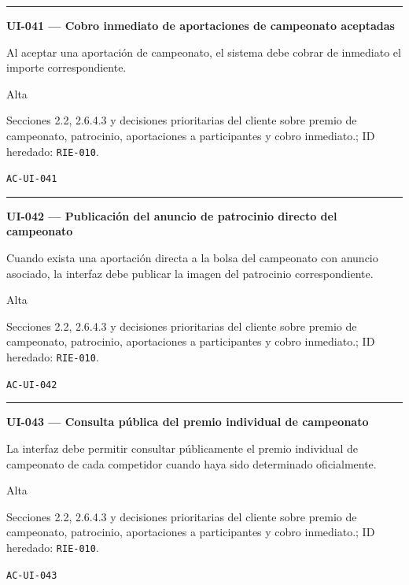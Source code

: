 \documentclass[10pt,letterpaper]{article}
\begin{document}
\vspace{0.25em}\hrule\vspace{0.65em}
\noindent\textbf{UI-041 --- Cobro inmediato de aportaciones de campeonato aceptadas}\par
\begin{description}[style=nextline,leftmargin=3.15cm,labelwidth=2.8cm,font=\normalfont\bfseries]
\item[Obligación] Al aceptar una aportación de campeonato, el sistema debe cobrar de inmediato el importe correspondiente.
\item[Prioridad] Alta
\item[Procedencia] Secciones 2.2, 2.6.4.3 y decisiones prioritarias del cliente sobre premio de campeonato, patrocinio, aportaciones a participantes y cobro inmediato.; ID heredado: \texttt{RIE-010}.
\item[Verificación] \texttt{AC-UI-041}
\end{description}
\vspace{0.25em}\hrule\vspace{0.65em}
\noindent\textbf{UI-042 --- Publicación del anuncio de patrocinio directo del campeonato}\par
\begin{description}[style=nextline,leftmargin=3.15cm,labelwidth=2.8cm,font=\normalfont\bfseries]
\item[Obligación] Cuando exista una aportación directa a la bolsa del campeonato con anuncio asociado, la interfaz debe publicar la imagen del patrocinio correspondiente.
\item[Prioridad] Alta
\item[Procedencia] Secciones 2.2, 2.6.4.3 y decisiones prioritarias del cliente sobre premio de campeonato, patrocinio, aportaciones a participantes y cobro inmediato.; ID heredado: \texttt{RIE-010}.
\item[Verificación] \texttt{AC-UI-042}
\end{description}
\vspace{0.25em}\hrule\vspace{0.65em}
\noindent\textbf{UI-043 --- Consulta pública del premio individual de campeonato}\par
\begin{description}[style=nextline,leftmargin=3.15cm,labelwidth=2.8cm,font=\normalfont\bfseries]
\item[Obligación] La interfaz debe permitir consultar públicamente el premio individual de campeonato de cada competidor cuando haya sido determinado oficialmente.
\item[Prioridad] Alta
\item[Procedencia] Secciones 2.2, 2.6.4.3 y decisiones prioritarias del cliente sobre premio de campeonato, patrocinio, aportaciones a participantes y cobro inmediato.; ID heredado: \texttt{RIE-010}.
\item[Verificación] \texttt{AC-UI-043}
\end{description}
\end{document}
